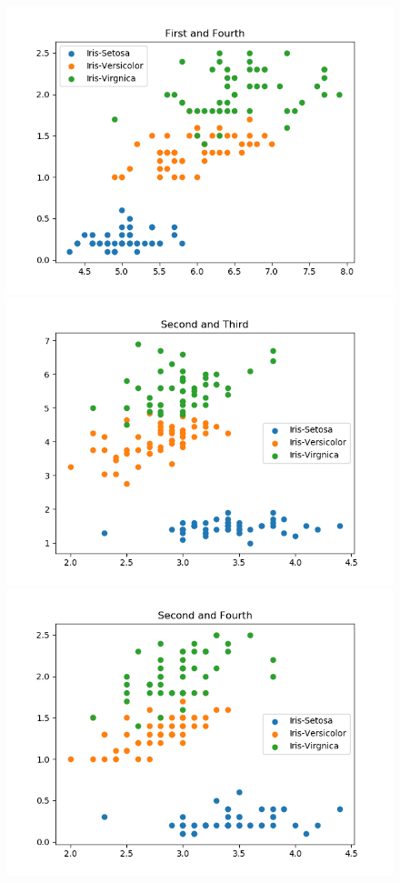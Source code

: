 \documentclass[a4paper]{article}
\begin{document}
\begin{figure}[h!]
\begin{minipage}[t]{6.5cm}
			\includegraphics[width=1.0\textwidth]{14.png}
		\end{minipage}
		\hspace{2cm}
		\begin{minipage}[t]{6.5cm}
			\includegraphics[width=1.0\textwidth]{23.png}
		\end{minipage}
		\begin{minipage}[t]{6.5cm}
			\includegraphics[width=1.0\textwidth]{24.png}

\end{minipage}
\end{figure}
\end{document}
